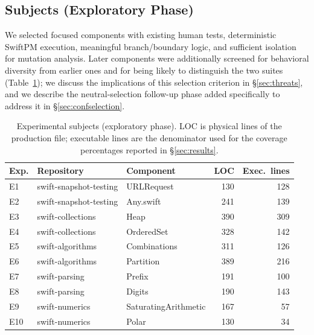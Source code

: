 \documentclass[10pt,conference]{IEEEtran}
\begin{document}
\subsection{Subjects (Exploratory Phase)}
\label{sec:subjects}
We selected focused components with existing human tests, deterministic SwiftPM execution, meaningful branch/boundary logic, and sufficient isolation for mutation analysis. Later components were additionally screened for behavioral diversity from earlier ones and for being likely to distinguish the two suites (Table~\ref{tab:subjects}); we discuss the implications of this selection criterion in \S\ref{sec:threats}, and we describe the neutral-selection follow-up phase added specifically to address it in \S\ref{sec:confselection}.

\begin{table}[ht]
\centering
\caption{Experimental subjects (exploratory phase). LOC is physical lines of the production file; executable lines are the denominator used for the coverage percentages reported in \S\ref{sec:results}.}
\label{tab:subjects}
\small
\begin{tabular}{lllrr}
\toprule
Exp. & Repository & Component & LOC & Exec.\ lines \\
\midrule
E1 & swift-snapshot-testing & URLRequest & 130 & 128 \\
E2 & swift-snapshot-testing & Any.swift & 241 & 139 \\
E3 & swift-collections & Heap & 390 & 309 \\
E4 & swift-collections & OrderedSet & 328 & 142 \\
E5 & swift-algorithms & Combinations & 311 & 126 \\
E6 & swift-algorithms & Partition & 389 & 216 \\
E7 & swift-parsing & Prefix & 191 & 100 \\
E8 & swift-parsing & Digits & 190 & 143 \\
E9 & swift-numerics & SaturatingArithmetic & 167 & 57 \\
E10 & swift-numerics & Polar & 130 & 34 \\
\bottomrule
\end{tabular}
\end{table}
\end{document}
